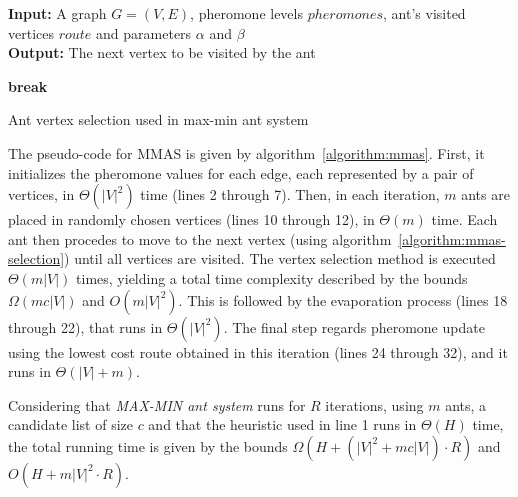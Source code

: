 \begin{algorithm}
  \textbf{Input:} A graph $G=(V,E)$, pheromone levels $pheromones$, ant's
  visited vertices $route$ and parameters $\alpha$ and $\beta$ \\
  \textbf{Output:} The next vertex to be visited by the ant
  \begin{algorithmic}[1]
      \ENDIF

        \item \textbf{break}
      \ENDIF
    \ENDFOR

      \ENDIF
    \ENDFOR
  \end{algorithmic}
  \caption{Ant vertex selection used in max-min ant system}
  \label{algorithm:mmas-selection}
\end{algorithm}

The pseudo-code for MMAS is given by algorithm~\ref{algorithm:mmas}. First, it
initializes the pheromone values for each edge, each represented by a pair of
vertices, in $\Theta(|V|^2)$ time (lines 2 through 7). Then, in each iteration,
$m$ ants are placed in randomly chosen vertices (lines 10 through 12), in
$\Theta(m)$ time. Each ant then procedes to move to the next vertex (using
algorithm~\ref{algorithm:mmas-selection}) until all vertices are visited.  The
vertex selection method is executed $\Theta(m|V|)$ times, yielding a total time
complexity described by the bounds $\Omega(mc|V|)$ and $O(m|V|^2)$. This is
followed by the evaporation process (lines 18 through 22), that runs in
$\Theta(|V|^2)$. The final step regards pheromone update using the lowest cost
route obtained in this iteration (lines 24 through 32), and it runs in
$\Theta(|V|+m)$. 

Considering that \textit{MAX-MIN ant system} runs for $R$ iterations, using $m$
ants, a candidate list of size $c$ and that the heuristic used in line 1 runs in
$\Theta(H)$ time, the total running time is given by the bounds $\Omega(H +
(|V|^2 + mc|V|)\cdot R)$ and $O(H+m|V|^2\cdot R)$.

